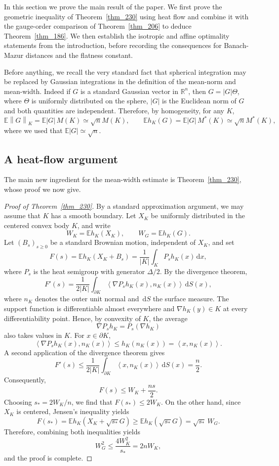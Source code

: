 \documentclass[12pt]{article}
\theoremstyle{definition}
\theoremstyle{remark}
\newcommand{\R}{\mathbb R}
\newcommand{\E}{\mathbb E}
\newcommand{\dd}{\,\mathrm d}
\newcommand{\ip}[2]{\left\langle #1,#2\right\rangle}
\newcommand{\norm}[1]{\left\lVert #1\right\rVert}
\begin{document}
In this section we prove the main result of the paper. We first prove the
geometric inequality of Theorem~\ref{thm_230} using heat flow and combine it with the
gauge-order comparison of Theorem~\ref{thm_206} to deduce
Theorem~\ref{thm_186}. We then establish the isotropic and affine optimality statements from the introduction, before recording the
consequences for Banach-Mazur distances and the flatness constant.

Before anything, we recall the very standard fact that spherical integration may be replaced by Gaussian integrations in the definition of the mean-norm and mean-width. Indeed if $G$ is a standard Gaussian vector in $\R^n$, then $G = |G|\Theta$, where $\Theta$ is uniformly distributed on the sphere, $|G|$ is the Euclidean norm of $G$ and both quantities are independent. Therefore, by homogeneity, for any $K$,
\begin{equation}\label{eq_949}
  \E\norm{G}_K=\E|G|\,M(K) \simeq \sqrt{n}M(K),
  \qquad
  \E h_K(G)=\E|G|\,M^*(K) \simeq \sqrt{n}M^*(K),
\end{equation}
where we used that $\E|G|\simeq\sqrt n.$

\subsection{A heat-flow argument}

The main new ingredient for the mean-width estimate is
Theorem~\ref{thm_230}, whose proof we now give.

\begin{proof}[Proof of Theorem~\ref{thm_230}]
By a standard approximation argument, we may assume that $K$ has a smooth boundary. Let $X_K$ be uniformly distributed in the centered
convex body $K$, and write
\[
  W_K=\E h_K(X_K),
  \qquad
  W_G=\E h_K(G).
\]
Let $(B_s)_{s\geq0}$ be a standard Brownian motion, independent of
$X_K$, and set
\[
  F(s)=\E h_K(X_K+B_s)
  =\frac{1}{|K|}\int_K P_s h_K(x)\dd x,
\]
where $P_s$ is the heat semigroup with generator $\Delta/2$. By the
divergence theorem,
\[
  F'(s)
  =\frac{1}{2|K|}
  \int_{\partial K}
  \ip{\nabla P_s h_K(x)}{n_K(x)}\dd S(x),
\]
where $n_K$ denotes the outer unit normal and $\dd S$ the surface measure.
The support function is differentiable almost everywhere and
$\nabla h_K(y)\in K$ at every differentiability point. Hence, by convexity of $K$, the average
\[
  \nabla P_s h_K=P_s(\nabla h_K)
\]
also takes values in $K$. For $x\in\partial K$,
\[
  \ip{\nabla P_s h_K(x)}{n_K(x)}
  \leq h_K(n_K(x))
  =\ip{x}{n_K(x)}.
\]
A second application of the divergence theorem gives
\[
  F'(s)
  \leq\frac{1}{2|K|}
  \int_{\partial K}\ip{x}{n_K(x)}\dd S(x)
  =\frac n2.
\]
Consequently,
\[
  F(s)\leq W_K+\frac{ns}{2}.
\]
Choosing $s_*=2W_K/n$, we find that $F(s_*)\leq2W_K$. On the other hand, since $X_K$ is centered, Jensen's inequality yields
\[
  F(s_*)
  =\E h_K(X_K+\sqrt{s_*}G)
  \geq\E h_K(\sqrt{s_*}G)
  =\sqrt{s_*}\,W_G.
\]
Therefore, combining both inequalities yields
\[
  W_G^2\leq\frac{4W_K^2}{s_*}=2nW_K,
\]
and the proof is complete.
\end{proof}
\end{document}

